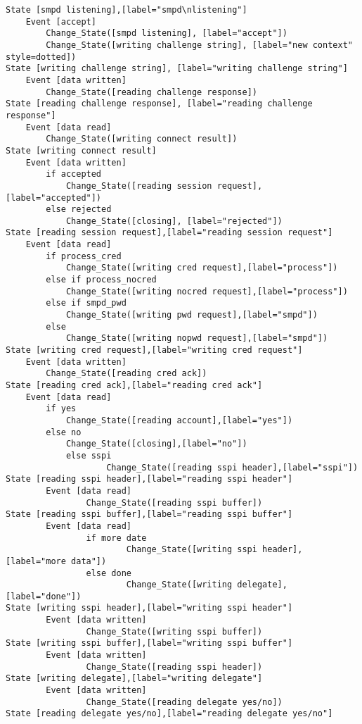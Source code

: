 \begin{comment}
This is the state machine for the smpd listener process.
Graph [smpd listener],
      [size="7.5, 10"]
\end{comment}
\begin{verbatim}
State [smpd listening],[label="smpd\nlistening"]
	Event [accept]
		Change_State([smpd listening], [label="accept"])
		Change_State([writing challenge string], [label="new context" style=dotted])
State [writing challenge string], [label="writing challenge string"]
	Event [data written]
		Change_State([reading challenge response])
State [reading challenge response], [label="reading challenge response"]
	Event [data read]
		Change_State([writing connect result])
State [writing connect result]
	Event [data written]
		if accepted
			Change_State([reading session request], [label="accepted"])
		else rejected
			Change_State([closing], [label="rejected"])
State [reading session request],[label="reading session request"]
	Event [data read]
		if process_cred
			Change_State([writing cred request],[label="process"])
		else if process_nocred
			Change_State([writing nocred request],[label="process"])
		else if smpd_pwd
			Change_State([writing pwd request],[label="smpd"])
		else
			Change_State([writing nopwd request],[label="smpd"])
State [writing cred request],[label="writing cred request"]
	Event [data written]
		Change_State([reading cred ack])
State [reading cred ack],[label="reading cred ack"]
	Event [data read]
		if yes
			Change_State([reading account],[label="yes"])
		else no
			Change_State([closing],[label="no"])
	        else sspi
	                Change_State([reading sspi header],[label="sspi"])
State [reading sspi header],[label="reading sspi header"]
        Event [data read]
                Change_State([reading sspi buffer])
State [reading sspi buffer],[label="reading sspi buffer"]
        Event [data read]
                if more date
                        Change_State([writing sspi header],[label="more data"])
                else done
                        Change_State([writing delegate],[label="done"])
State [writing sspi header],[label="writing sspi header"]
        Event [data written]
                Change_State([writing sspi buffer])
State [writing sspi buffer],[label="writing sspi buffer"]
        Event [data written]
                Change_State([reading sspi header])
State [writing delegate],[label="writing delegate"]
        Event [data written]
                Change_State([reading delegate yes/no])
State [reading delegate yes/no],[label="reading delegate yes/no"]

\end{verbatim}
